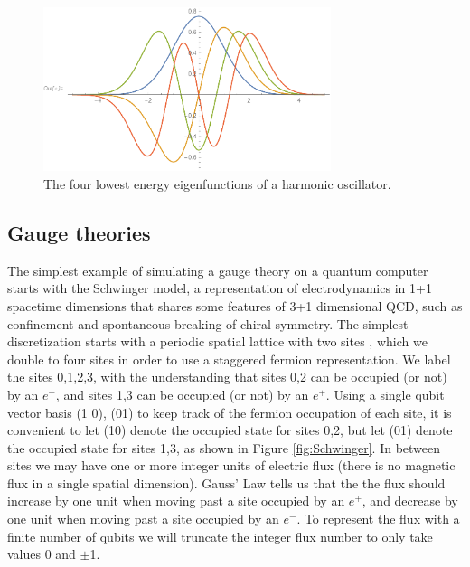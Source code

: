\documentclass[a4paper,11pt]{article}
\begin{document}
%
\begin{figure}[tb]
\centering
\includegraphics[width=0.75\textwidth]{figs/Hermite.pdf}
\caption{The four lowest energy eigenfunctions of a harmonic oscillator.  \label{fig:Hermite}}
\end{figure}
%

\subsection{Gauge theories}\label{ss:Schwinger}
The simplest example of simulating a gauge theory on a quantum computer starts with the Schwinger model, a representation of
electrodynamics in 1+1 spacetime dimensions that shares some features of 3+1 dimensional QCD, such as confinement and spontaneous breaking
of chiral symmetry. The simplest discretization starts with a periodic spatial lattice with two sites \cite{Klco:2018kyo}, which we double to four sites in order to use a
staggered fermion representation. We label the sites 0,1,2,3, with the understanding that sites 0,2 can be occupied (or not) by an $e^-$, and sites
1,3 can be occupied (or not) by an $e^+$. Using a single qubit vector basis (1 0), (01) to keep track of the fermion occupation of each site, it is convenient to let 
(10) denote the occupied state for sites 0,2, but let (01) denote the occupied state for sites 1,3, as shown in Figure \ref{fig:Schwinger}.
In between sites we may have one or more integer units of electric flux (there is no magnetic flux in a single spatial dimension). Gauss' Law tells us that
the the flux should increase by one unit when moving past a site occupied by an $e^+$, and decrease by one unit when moving past a site occupied by an $e^-$.
To represent the flux with a finite number of qubits we will truncate the integer flux number to only take values 0 and $\pm$1.
\end{document}
